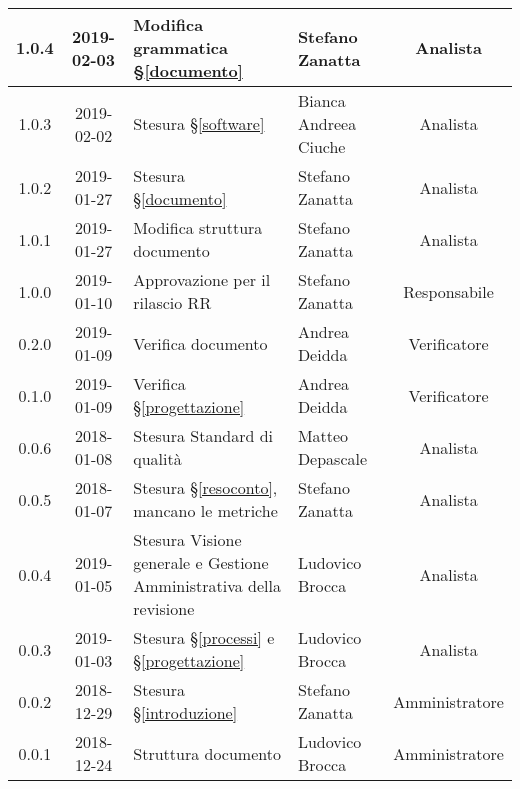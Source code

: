 \begin{center}
\begin{tabularx}{\textwidth}{|c|c|X|X|c|}
			\hline
			1.0.4 & 2019-02-03 & Modifica grammatica \S\ref{documento}& Stefano Zanatta & Analista\\
			\hline
			1.0.3 & 2019-02-02 & Stesura \S\ref{software}& Bianca Andreea Ciuche & Analista\\
			\hline
			1.0.2 & 2019-01-27 & Stesura \S\ref{documento}& Stefano Zanatta & Analista\\
			\hline
			1.0.1 & 2019-01-27 & Modifica struttura documento & Stefano Zanatta & Analista\\
			\hline
			1.0.0 & 2019-01-10 & Approvazione per il rilascio RR & Stefano Zanatta & Responsabile\\
			\hline
			0.2.0 & 2019-01-09 & Verifica documento & Andrea Deidda & Verificatore\\
			\hline
			0.1.0 & 2019-01-09 & Verifica \S\ref{progettazione} & Andrea Deidda & Verificatore\\
			\hline
			0.0.6 & 2018-01-08 & Stesura Standard di qualità & Matteo Depascale & Analista\\
			\hline
			0.0.5 & 2018-01-07 & Stesura \S\ref{resoconto}, mancano le metriche & Stefano Zanatta & Analista\\
			\hline
			0.0.4 & 2019-01-05 & Stesura Visione generale e Gestione Amministrativa della revisione  & Ludovico Brocca& Analista\\
			\hline
			0.0.3 & 2019-01-03& Stesura \S\ref{processi} e \S\ref{progettazione} &Ludovico Brocca & Analista\\
			\hline
			0.0.2 & 2018-12-29 & Stesura \S\ref{introduzione} & Stefano Zanatta & Amministratore\\
			\hline
			0.0.1 & 2018-12-24 & Struttura documento & Ludovico Brocca & Amministratore\\
			\hline
		\end{tabularx}
	\end{center}
\newpage
